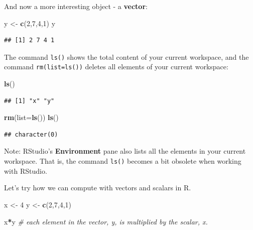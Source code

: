 \documentclass[]{book}
\newenvironment{Shaded}{\begin{snugshade}}{\end{snugshade}}
\newcommand{\CommentTok}[1]{\textcolor[rgb]{0.56,0.35,0.01}{\textit{#1}}}
\newcommand{\DataTypeTok}[1]{\textcolor[rgb]{0.13,0.29,0.53}{#1}}
\newcommand{\DecValTok}[1]{\textcolor[rgb]{0.00,0.00,0.81}{#1}}
\newcommand{\KeywordTok}[1]{\textcolor[rgb]{0.13,0.29,0.53}{\textbf{#1}}}
\newcommand{\NormalTok}[1]{#1}
\newcommand{\OperatorTok}[1]{\textcolor[rgb]{0.81,0.36,0.00}{\textbf{#1}}}
\newcommand{\StringTok}[1]{\textcolor[rgb]{0.31,0.60,0.02}{#1}}
\theoremstyle{definition}
\theoremstyle{definition}
\theoremstyle{definition}
\theoremstyle{remark}
\begin{document}
And now a more interesting object - a \textbf{vector}:

\begin{Shaded}
\begin{Highlighting}[]
\NormalTok{y <-}\StringTok{ }\KeywordTok{c}\NormalTok{(}\DecValTok{2}\NormalTok{,}\DecValTok{7}\NormalTok{,}\DecValTok{4}\NormalTok{,}\DecValTok{1}\NormalTok{)}
\NormalTok{y}
\end{Highlighting}
\end{Shaded}

\begin{verbatim}
## [1] 2 7 4 1
\end{verbatim}

The command \texttt{ls()} shows the total content of your current workspace, and the command \texttt{rm(list=ls())} deletes all elements of your current workspace:

\begin{Shaded}
\begin{Highlighting}[]
\KeywordTok{ls}\NormalTok{()}
\end{Highlighting}
\end{Shaded}

\begin{verbatim}
## [1] "x" "y"
\end{verbatim}

\begin{Shaded}
\begin{Highlighting}[]
\KeywordTok{rm}\NormalTok{(}\DataTypeTok{list=}\KeywordTok{ls}\NormalTok{())}
\KeywordTok{ls}\NormalTok{()}
\end{Highlighting}
\end{Shaded}

\begin{verbatim}
## character(0)
\end{verbatim}

Note: RStudio's \textbf{Environment} pane also lists all the elements in your current workspace. That is, the command \texttt{ls()} becomes a bit obsolete when working with RStudio.

Let's try how we can compute with vectors and scalars in R.

\begin{Shaded}
\begin{Highlighting}[]
\NormalTok{x <-}\StringTok{ }\DecValTok{4}
\NormalTok{y <-}\StringTok{ }\KeywordTok{c}\NormalTok{(}\DecValTok{2}\NormalTok{,}\DecValTok{7}\NormalTok{,}\DecValTok{4}\NormalTok{,}\DecValTok{1}\NormalTok{)}

\NormalTok{x}\OperatorTok{*}\NormalTok{y }\CommentTok{# each element in the vector, y, is multiplied by the scalar, x.}
\end{Highlighting}
\end{Shaded}
\end{document}
